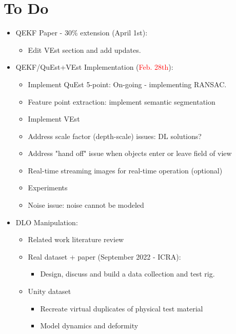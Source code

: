 \documentclass[11pt]{article}
\begin{document}
\section{To Do}
\begin{itemize}
  \item QEKF Paper - 30\% extension (April 1st):
  \begin{itemize}
      \item Edit VEst section and add updates.
  \end{itemize}
  \item QEKF/QuEst+VEst Implementation (\textcolor{red}{Feb. 28th}):
  \begin{itemize}
      \item Implement QuEst 5-point: On-going - implementing RANSAC.
      \item Feature point extraction: implement semantic segmentation
      \item Implement VEst
      \item Address scale factor (depth-scale) issues: DL solutions?
      \item Address "hand off" issue when objects enter or leave field of view
      \item Real-time streaming images for real-time operation (optional)
      \item Experiments
      \item Noise issue: noise cannot be modeled
  \end{itemize}
  \item  DLO Manipulation:
  \begin{itemize}
      \item Related work literature review
      \item Real dataset + paper (September 2022 - ICRA):
      \begin{itemize}
            \item Design, discuss and build a data collection and test rig.
      \end{itemize}
      \item Unity dataset
      \begin{itemize}
            \item Recreate virtual duplicates of physical test material
            \item Model dynamics and deformity
      \end{itemize}
  \end{itemize}
\end{itemize}
\end{document}
